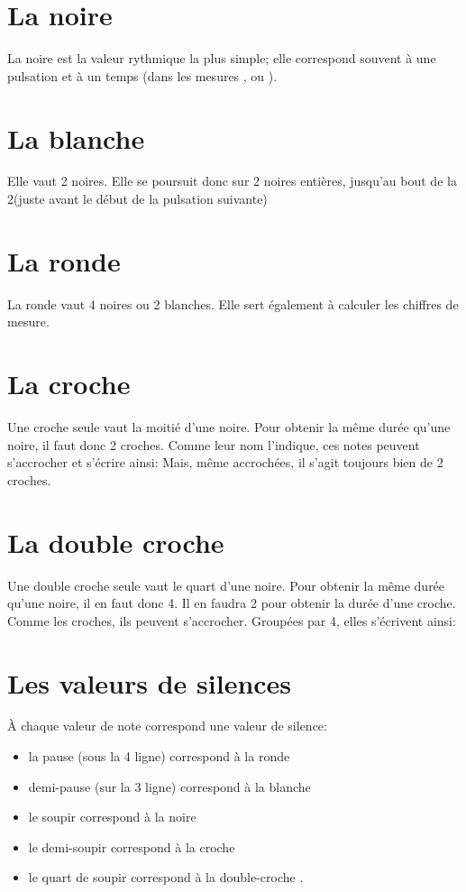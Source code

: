 \section[La noire]{La noire \crotchet}
La noire est la valeur rythmique la plus simple; elle correspond souvent à une pulsation et à un temps (dans les mesures ,  ou ).
\section[La blanche]{La blanche \halfNote}
Elle vaut 2 noires. Elle se poursuit donc sur 2 noires entières, jusqu'au bout de la 2\ieme { }(juste avant le début de la pulsation suivante)
\section[La ronde]{La ronde \wholeNote}
La ronde vaut 4 noires ou 2 blanches. Elle sert également à calculer les chiffres de mesure.
\section[La croche]{La croche \quaver}
Une croche seule vaut la moitié d'une noire. Pour obtenir la même durée qu'une noire, il faut donc 2 croches. Comme leur nom l'indique, ces notes peuvent s'accrocher et s'écrire ainsi: \twoBeamedQuavers{}
Mais, même accrochées, il s'agit toujours bien de 2 croches.
\section[La double croche]{La double croche \semiquaver}
Une double croche seule vaut le quart d'une noire. Pour obtenir la même durée qu'une noire, il en faut donc 4. Il en faudra 2 pour obtenir la durée d'une croche. Comme les croches, ils peuvent s'accrocher. Groupées par 4, elles s'écrivent ainsi: \beamedSixteenth %

\section{Les valeurs de silences}
À chaque valeur de note correspond une valeur de silence:
\begin{itemize}
\item la pause \hspace{1ex}\wholeNoteRest{}\hspace{1ex} (sous la 4\ieme{} ligne) correspond à la ronde
\item demi-pause \hspace{1ex}\halfNoteRest\hspace{1ex} (sur la 3\ieme{} ligne) correspond à la blanche
\item le soupir \crotchetRest{} correspond à la noire
\item le demi-soupir \quaverRest{} correspond à la croche
\item le quart de soupir \semiquaverRest{} correspond à la double-croche .
\end{itemize}

